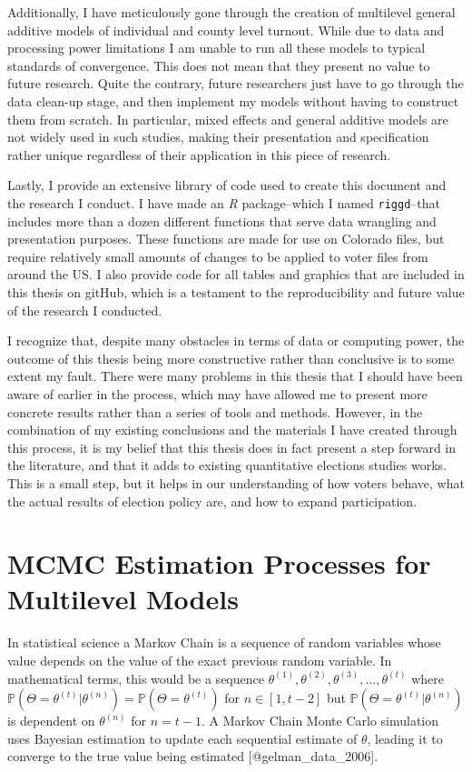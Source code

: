 \documentclass[]{article}
\begin{document}
Additionally, I have meticulously gone through the creation of
multilevel general additive models of individual and county level
turnout. While due to data and processing power limitations I am unable
to run all these models to typical standards of convergence. This does
not mean that they present no value to future research. Quite the
contrary, future researchers just have to go through the data clean-up
stage, and then implement my models without having to construct them
from scratch. In particular, mixed effects and general additive models
are not widely used in such studies, making their presentation and
specification rather unique regardless of their application in this
piece of research.

Lastly, I provide an extensive library of code used to create this
document and the research I conduct. I have made an \textit{R}
package--which I named \texttt{riggd}--that includes more than a dozen
different functions that serve data wrangling and presentation purposes.
These functions are made for use on Colorado files, but require
relatively small amounts of changes to be applied to voter files from
around the US. I also provide code for all tables and graphics that are
included in this thesis on gitHub, which is a testament to the
reproducibility and future value of the research I conducted.

I recognize that, despite many obstacles in terms of data or computing
power, the outcome of this thesis being more constructive rather than
conclusive is to some extent my fault. There were many problems in this
thesis that I should have been aware of earlier in the process, which
may have allowed me to present more concrete results rather than a
series of tools and methods. However, in the combination of my existing
conclusions and the materials I have created through this process, it is
my belief that this thesis does in fact present a step forward in the
literature, and that it adds to existing quantitative elections studies
works. This is a small step, but it helps in our understanding of how
voters behave, what the actual results of election policy are, and how
to expand participation.

\appendix

\section{MCMC Estimation Processes for Multilevel
Models}\label{mcmc-estimation-processes-for-multilevel-models}

In statistical science a Markov Chain is a sequence of random variables
whose value depends on the value of the exact previous random variable.
In mathematical terms, this would be a sequence
\(\theta^{(1)}, \theta^{(2)}, \theta^{(3)}, ..., \theta^{(t)}\) where
\(\mathbb{P}(\Theta = \theta^{(t)}|\theta^{(n)}) = \mathbb{P}(\Theta = \theta^{(t)})\)
for \(n \in [1,t-2]\) but
\(\mathbb{P}(\Theta = \theta^{(t)}|\theta^{(n)})\) is dependent on
\(\theta^{(n)}\) for \(n = t-1\). A Markov Chain Monte Carlo simulation
uses Bayesian estimation to update each sequential estimate of
\(\theta\), leading it to converge to the true value being estimated
{[}@gelman\_data\_2006{]}.
\end{document}
